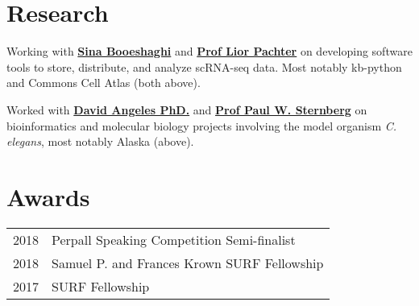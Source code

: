 \documentclass[]{resume}
\begin{document}
\begin{minipage}[t]{0.66\textwidth}
\section{Research}
Working with \textbf{\href{https://sinabooeshaghi.com/}{Sina Booeshaghi}} and \textbf{\href{https://pachterlab.github.io/biography.html}{Prof Lior Pachter}} on developing software tools to store, distribute, and analyze scRNA-seq data. Most notably kb-python and Commons Cell Atlas (both above).
\sectionsep

Worked with \textbf{\href{https://dangeles.github.io/}{David Angeles PhD.}} and \textbf{\href{http://wormlab.caltech.edu/LabMembers/Paul}{Prof Paul W. Sternberg}} on bioinformatics and molecular biology projects involving the model organism \textit{C. elegans}, most notably Alaska (above).
\sectionsep




\section{Awards}
\begin{tabular}{rl}
2018     & Perpall Speaking Competition Semi-finalist \\
2018     & Samuel P. and Frances Krown SURF Fellowship  \\
2017     & SURF Fellowship \\
\end{tabular}
\sectionsep



\end{minipage}
\end{document}
